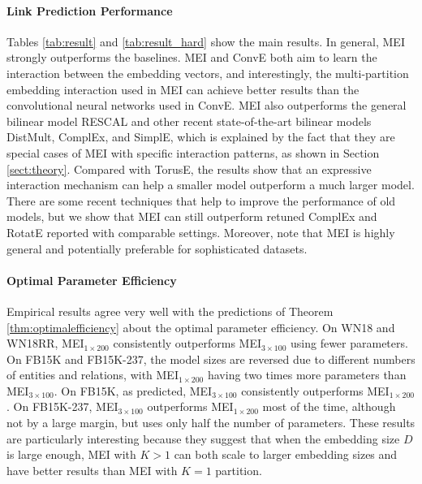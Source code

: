 \documentclass{ecai}
\theoremstyle{plain}  \newtheorem{thm}{Theorem}  \newtheorem{lem}[thm]{Lemma}  \newtheorem{prop}[thm]{Proposition}
\theoremstyle{remark}  \newtheorem*{rem}{Remark}
\begin{document}
\paragraph{Link Prediction Performance}
Tables \ref{tab:result} and \ref{tab:result_hard} show the main results. In general, MEI strongly outperforms the baselines. MEI and ConvE both aim to learn the interaction between the embedding vectors, and interestingly, the multi-partition embedding interaction used in MEI can achieve better results than the convolutional neural networks used in ConvE. MEI also outperforms the general bilinear model RESCAL and other recent state-of-the-art bilinear models DistMult, ComplEx, and SimplE, which is explained by the fact that they are special cases of MEI with specific interaction patterns, as shown in Section \ref{sect:theory}. Compared with TorusE, the results show that an expressive interaction mechanism can help a smaller model outperform a much larger model. There are some recent techniques that help to improve the performance of old models, but we show that MEI can still outperform retuned ComplEx and RotatE reported with comparable settings. Moreover, note that MEI is highly general and potentially preferable for sophisticated datasets.

\paragraph{Optimal Parameter Efficiency}
Empirical results agree very well with the predictions of Theorem \ref{thm:optimalefficiency} about the optimal parameter efficiency. On WN18 and WN18RR, MEI$ _{1 \times 200} $ consistently outperforms MEI$ _{3 \times 100} $ using fewer parameters. On FB15K and FB15K-237, the model sizes are reversed due to different numbers of entities and relations, with MEI$ _{1 \times 200} $ having two times more parameters than MEI$ _{3 \times 100} $. On FB15K, as predicted, MEI$ _{3 \times 100} $ consistently outperforms MEI$ _{1 \times 200} $. On FB15K-237, MEI$ _{3 \times 100} $ outperforms MEI$ _{1 \times 200} $ most of the time, although not by a large margin, but uses only half the number of parameters. These results are particularly interesting because they suggest that when the embedding size $ D $ is large enough, MEI with $ K > 1 $ can both scale to larger embedding sizes and have better results than MEI with $ K = 1 $ partition.
\end{document}
